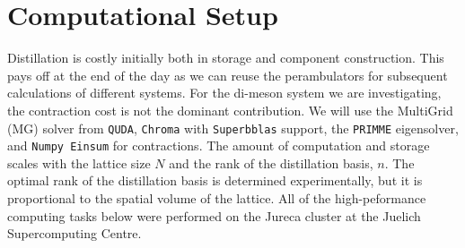 
\chapter{Computational Setup}
\label{sec:comp}

Distillation is costly initially both in storage and component construction. This pays off at the end of the day as we can reuse the perambulators for subsequent calculations of different systems. For the di-meson system we are investigating, the contraction cost is not the dominant contribution. We will use the MultiGrid (MG) solver from \texttt{QUDA}, \texttt{Chroma} with \texttt{Superbblas} support, the \texttt{PRIMME} eigensolver, and \texttt{Numpy Einsum} for contractions. The amount of computation and storage scales with the lattice size $N$ and the rank of the distillation basis, $n$. The optimal rank of the distillation basis is determined experimentally, but it is proportional to the spatial volume of the lattice. All of the high-peformance computing tasks below were performed on the Jureca cluster at the Juelich Supercomputing Centre. 

